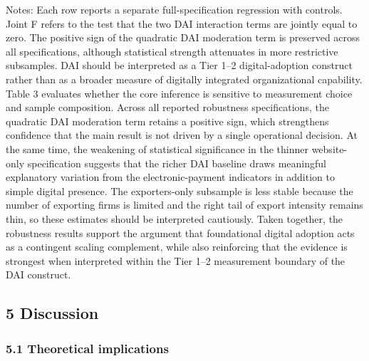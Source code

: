 \documentclass[12pt,a4paper]{article}
\begin{document}
Notes: Each row reports a separate full-specification regression with
controls. Joint F refers to the test that the two DAI interaction terms
are jointly equal to zero. The positive sign of the quadratic DAI
moderation term is preserved across all specifications, although
statistical strength attenuates in more restrictive subsamples. DAI
should be interpreted as a Tier 1--2 digital-adoption construct rather
than as a broader measure of digitally integrated organizational
capability. Table 3 evaluates whether the core inference is sensitive to
measurement choice and sample composition. Across all reported
robustness specifications, the quadratic DAI moderation term retains a
positive sign, which strengthens confidence that the main result is not
driven by a single operational decision. At the same time, the weakening
of statistical significance in the thinner website-only specification
suggests that the richer DAI baseline draws meaningful explanatory
variation from the electronic-payment indicators in addition to simple
digital presence. The exporters-only subsample is less stable because
the number of exporting firms is limited and the right tail of export
intensity remains thin, so these estimates should be interpreted
cautiously. Taken together, the robustness results support the argument
that foundational digital adoption acts as a contingent scaling
complement, while also reinforcing that the evidence is strongest when
interpreted within the Tier 1--2 measurement boundary of the DAI
construct.

\hypertarget{5-discussion}{%
\subsection{5 Discussion}\label{5-discussion}}

\hypertarget{51-theoretical-implications}{%
\subsubsection{5.1 Theoretical
implications}\label{51-theoretical-implications}}
\end{document}
